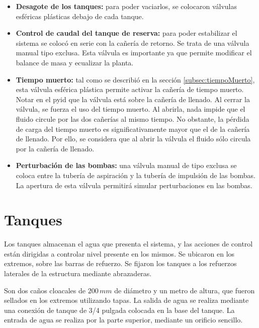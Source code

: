 \begin{itemize}
  \item \textbf{Desagote de los tanques:}
  para poder vaciarlos, se colocaron válvulas esféricas plásticas debajo de
cada tanque.

  \item \textbf{Control de caudal del tanque de reserva:}
  para poder estabilizar el sistema se colocó en serie con la cañería de
retorno. Se trata de una válvula manual tipo exclusa.
  Esta válvula es importante ya que permite modificar el balance de masa y
ecualizar la planta.

  \item \textbf{Tiempo muerto:}
  tal como se describió en la sección \ref{subsec:tiempoMuerto}, esta válvula
esférica plástica permite activar la cañería de tiempo muerto.
  Notar en el \gls{pyid} que la válvula está sobre la cañería de llenado.
  Al cerrar la válvula, se fuerza el uso del tiempo muerto.
  Al abrirla, nada impide que el fluido circule por las dos cañerías al mismo
tiempo.
  No obstante, la pérdida de carga del tiempo muerto es significativamente
mayor que el de la cañería de llenado.
  Por ello, se considera que al abrir la válvula  el fluido sólo circula
por la cañería de llenado.

  \item \textbf{Perturbación de las bombas:}
  una válvula manual de tipo exclusa se coloca entre la tubería de aspiración y
la tubería de impulsión de las bombas.
  La apertura de esta válvula permitirá simular perturbaciones en las
bombas.
 \end{itemize}

\section{Tanques}
\label{sec:Tanques}

Los tanques almacenan el agua que presenta el sistema, y las acciones de
control están dirigidas a controlar nivel presente en los mismos.
Se ubicaron en los extremos, sobre las barras de refuerzo.
Se fijaron los tanques a los refuerzos laterales de la estructura mediante
abrazaderas.

Son dos caños cloacales de $200\,mm$ de diámetro y un metro de altura, que
fueron
sellados en los extremos utilizando tapas.
La salida de agua se realiza mediante una conexión de tanque de 3/4 pulgada
colocada en la base del tanque.
La entrada de agua se realiza por la parte superior, mediante un orificio
sencillo.

